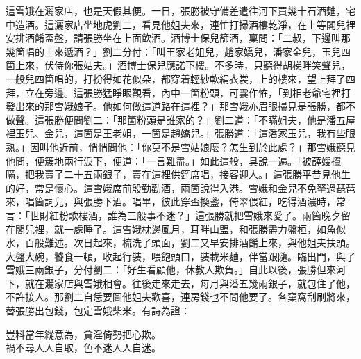 這雪娥在灑家店，也是天假其便。一日，張勝被守備差遣往河下買幾十石酒麯，宅中造酒。這灑家店坐地虎劉二，看見他姐夫來，連忙打掃酒樓乾淨，在上等閣兒裡安排酒餚盃盤，請張勝坐在上面飲酒。酒博士保兒篩酒，稟問：「二叔，下邊叫那幾箇唱的上來遞酒？」劉二分付：「叫王家老姐兒，趙家嬌兒，潘家金兒，玉兒四箇上來，伏侍你張姑夫。」酒博士保兒應諾下樓。不多時，只聽得胡梯畔笑聲兒，一般兒四箇唱的，打扮得如花似朵，都穿着輕紗軟絹衣裳，上的樓來，望上拜了四拜，立在旁邊。這張勝猛睜眼觀看，內中一箇粉頭，可霎作恠，「到相老爺宅裡打發出來的那雪娥娘子。他如何做這道路在這裡？」那雪娥亦眉眼掃見是張勝，都不做聲。這張勝便問劉二：「那箇粉頭是誰家的？」劉二道：「不瞞姐夫，他是潘五屋裡玉兒、金兒，這箇是王老姐，一箇是趙嬌兒。」張勝道：「這潘家玉兒，我有些眼熟。」因叫他近前，悄悄問他：「你莫不是雪姑娘麼？怎生到於此處？」那雪娥聽見他問，便簇地兩行淚下，便道：「一言難盡。」如此這般，具說一遍。「被薛嫂攛瞞，把我賣了二十五兩銀子，賣在這裡供筵席唱，接客迎人。」這張勝平昔見他生的好，常是懷心。這雪娥席前殷勤勸酒，兩箇說得入港。雪娥和金兒不免拏過琵琶來，唱箇詞兒，與張勝下酒。唱畢，彼此穿盃換盞，倚翠偎紅，吃得酒濃時，常言：「世財紅粉歌樓酒，誰為三般事不迷？」這張勝就把雪娥來愛了。兩箇晚夕留在閣兒裡，就一處睡了。這雪娥枕邊風月，耳畔山盟，和張勝盡力盤桓，如魚似水，百般難述。次日起來，梳洗了頭面，劉二又早安排酒餚上來，與他姐夫扶頭。大盤大碗，饕食一頓，收起行裝，喂飽頭口，裝載米麯，伴當跟隨。臨出門，與了雪娥三兩銀子，分付劉二：「好生看顧他，休教人欺負。」自此以後，張勝但來河下，就在灑家店與雪娥相會。往後走來走去，每月與潘五幾兩銀子，就包住了他，不許接人。那劉二自恁要圖他姐夫歡喜，連房錢也不問他要了。各窠窩刮刷將來，替張勝出包錢，包定雪娥柴米。有詩為證：

\begin{myquote}
豈料當年縱意為，貪淫倚勢把心欺。\\禍不尋人人自取，色不迷人人自迷。
\end{myquote}

